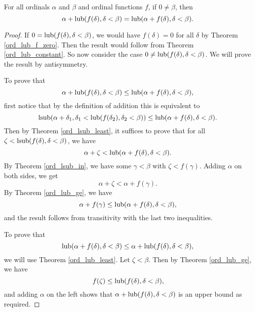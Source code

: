 \documentclass[../../math.tex]{subfiles}
\begin{document}
\begin{theorem} \label{ord_lub_plus}
    For all ordinals $\alpha$ and $\beta$ and ordinal functions $f$, if $0 \neq
    \beta$, then
    \[
        \alpha + \operatorname{lub}(f(\delta), \delta < \beta)
        = \operatorname{lub}(\alpha + f(\delta), \delta < \beta).
    \]
\end{theorem}
\begin{proof}
    If $0 = \operatorname{lub}(f(\delta), \delta < \beta)$, we would have $f(\delta) = 0$ for
    all $\delta$ by Theorem \ref{ord_lub_f_zero}.  Then the result would follow
    from Theorem \ref{ord_lub_constant}.  So now consider the case $0 \neq
    \operatorname{lub}(f(\delta), \delta < \beta)$.  We will prove the result by antisymmetry.

    To prove that
    \[
        \alpha + \operatorname{lub}(f(\delta), \delta < \beta)
        \leq \operatorname{lub}(\alpha + f(\delta), \delta < \beta),
    \]
    first notice that by the definition of addition this is equivalent to
    \[
        \operatorname{lsub}(\alpha + \delta_1, \delta_1 < \operatorname{lub}(f(\delta_2), \delta_2 < \beta))
        \leq \operatorname{lub}(\alpha + f(\delta), \delta < \beta).
    \]
    Then by Theorem \ref{ord_lsub_least}, it suffices to prove that for all
    $\zeta < \operatorname{lsub}(f(\delta), \delta < \beta)$, we have
    \[
        \alpha + \zeta < \operatorname{lub}(\alpha + f(\delta), \delta < \beta).
    \]
    By Theorem \ref{ord_lsub_in}, we have some $\gamma < \beta$ with $\zeta
    < f(\gamma)$.  Adding $\alpha$ on both sides, we get
    \[
        \alpha + \zeta < \alpha + f(\gamma).
    \]
    By Theorem \ref{ord_lub_ge}, we have
    \[
        \alpha + f(\gamma) \leq \operatorname{lub}(\alpha + f(\delta), \delta < \beta),
    \]
    and the result follows from transitivity with the last two inequalities.

    To prove that
    \[
        \operatorname{lub}(\alpha + f(\delta), \delta < \beta)
        \leq \alpha + \operatorname{lub}(f(\delta), \delta < \beta),
    \]
    we will use Theorem \ref{ord_lub_least}.  Let $\zeta < \beta$.  Then by
    Theorem \ref{ord_lub_ge}, we have
    \[
        f(\zeta) \leq \operatorname{lub}(f(\delta), \delta < \beta),
    \]
    and adding $\alpha$ on the left shows that $\alpha + \operatorname{lub}(f(\delta), \delta
    < \beta)$ is an upper bound as required.
\end{proof}
\end{document}
